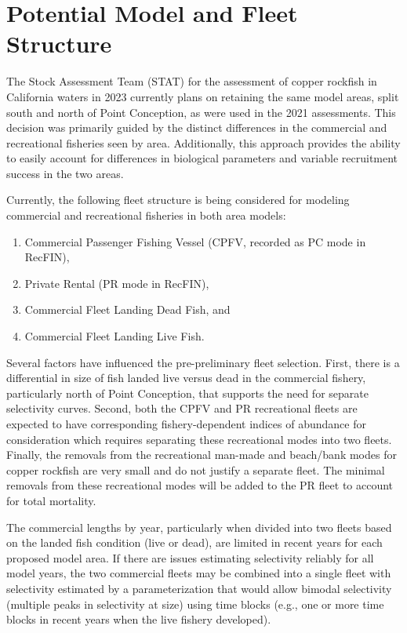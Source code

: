 \documentclass[
]{article}
\providecommand{\tightlist}{%
  \setlength{\itemsep}{0pt}\setlength{\parskip}{0pt}}
\begin{document}
\hypertarget{potential-model-and-fleet-structure}{%
\section{Potential Model and Fleet
Structure}\label{potential-model-and-fleet-structure}}

The Stock Assessment Team (STAT) for the assessment of copper rockfish
in California waters in 2023 currently plans on retaining the same model
areas, split south and north of Point Conception, as were used in the
2021 assessments. This decision was primarily guided by the distinct
differences in the commercial and recreational fisheries seen by area.
Additionally, this approach provides the ability to easily account for
differences in biological parameters and variable recruitment success in
the two areas.

Currently, the following fleet structure is being considered for
modeling commercial and recreational fisheries in both area models:

\begin{enumerate}
\def\labelenumi{\arabic{enumi}.}
\tightlist
\item
  Commercial Passenger Fishing Vessel (CPFV, recorded as PC mode in
  RecFIN),
\item
  Private Rental (PR mode in RecFIN),
\item
  Commercial Fleet Landing Dead Fish, and
\item
  Commercial Fleet Landing Live Fish.
\end{enumerate}

Several factors have influenced the pre-preliminary fleet selection.
First, there is a differential in size of fish landed live versus dead
in the commercial fishery, particularly north of Point Conception, that
supports the need for separate selectivity curves. Second, both the CPFV
and PR recreational fleets are expected to have corresponding
fishery-dependent indices of abundance for consideration which requires
separating these recreational modes into two fleets. Finally, the
removals from the recreational man-made and beach/bank modes for copper
rockfish are very small and do not justify a separate fleet. The minimal
removals from these recreational modes will be added to the PR fleet to
account for total mortality.

The commercial lengths by year, particularly when divided into two
fleets based on the landed fish condition (live or dead), are limited in
recent years for each proposed model area. If there are issues
estimating selectivity reliably for all model years, the two commercial
fleets may be combined into a single fleet with selectivity estimated by
a parameterization that would allow bimodal selectivity (multiple peaks
in selectivity at size) using time blocks (e.g., one or more time blocks
in recent years when the live fishery developed).
\end{document}
